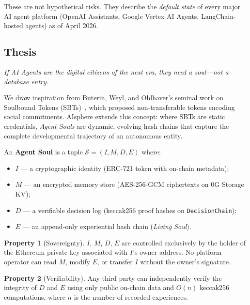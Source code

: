 \documentclass[10pt,a4paper]{article}
\theoremstyle{definition}
\newtheorem{property}{Property}[section]
\theoremstyle{plain}
\begin{document}
These are not hypothetical risks. They describe the \emph{default state} of every major AI agent platform (OpenAI Assistants, Google Vertex AI Agents, LangChain-hosted agents) as of April 2026.

\subsection{Thesis}

\begin{quotebox}
\textit{If AI Agents are the digital citizens of the next era, they need a soul---not a database entry.}
\end{quotebox}

We draw inspiration from Buterin, Weyl, and Ohlhaver's seminal work on Soulbound Tokens (SBTs)~\cite{sbt2022}, which proposed non-transferable tokens encoding social commitments. AIsphere extends this concept: where SBTs are static credentials, \emph{Agent Souls} are dynamic, evolving hash chains that capture the complete developmental trajectory of an autonomous entity.

\begin{defbox}
An \textbf{Agent Soul} is a tuple $\mathcal{S} = (I, M, D, E)$ where:
\begin{itemize}[leftmargin=1.2em, itemsep=1pt]
  \item $I$ --- a cryptographic identity (ERC-721 token with on-chain metadata);
  \item $M$ --- an encrypted memory store (AES-256-GCM ciphertexts on 0G Storage KV);
  \item $D$ --- a verifiable decision log (keccak256 proof hashes on \texttt{DecisionChain});
  \item $E$ --- an append-only experiential hash chain (\emph{Living Soul}).
\end{itemize}
\end{defbox}

\begin{property}[Sovereignty]\label{prop:sovereignty}
$I$, $M$, $D$, $E$ are controlled exclusively by the holder of the Ethereum private key associated with $I$'s owner address. No platform operator can read $M$, modify $E$, or transfer $I$ without the owner's signature.
\end{property}

\begin{property}[Verifiability]\label{prop:verifiability}
Any third party can independently verify the integrity of $D$ and $E$ using only public on-chain data and $O(n)$ keccak256 computations, where $n$ is the number of recorded experiences.
\end{property}
\end{document}
